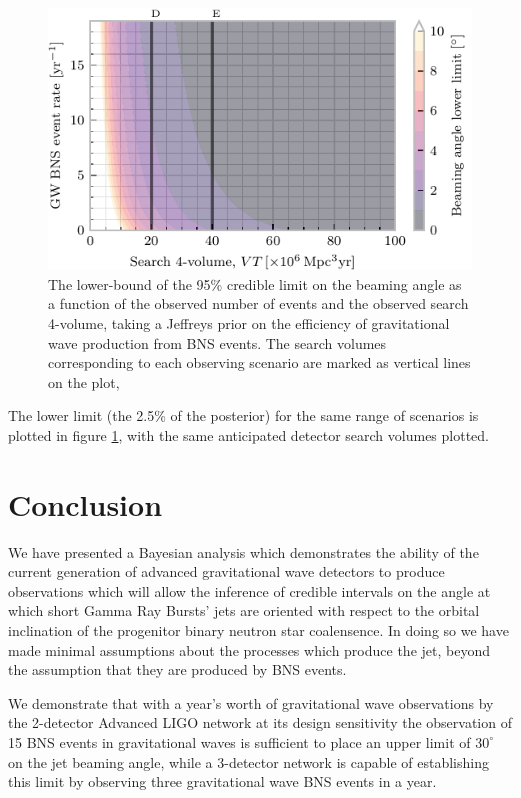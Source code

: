 \documentclass[twocolumn,nofootinbib]{revtex4-1}
\begin{document}
\begin{figure}
\centering
\includegraphics[width=\linewidth]{volume_v_nevents_lower.pdf}
\caption{\label{fig:volumevevents_lower} The lower-bound of the 95\%
  credible limit on the beaming angle as a function of the observed
  number of events and the observed search 4-volume, taking a Jeffreys
  prior on the efficiency of gravitational wave production from BNS
  events. The search volumes corresponding to each observing scenario
  are marked as vertical lines on the plot, }
\end{figure}

The lower limit (the 2.5\% of the posterior) for the same range of
scenarios is plotted in figure \ref{fig:volumevevents_lower}, with the
same anticipated detector search volumes plotted.

\section{Conclusion}

We have presented a Bayesian analysis which demonstrates the ability
of the current generation of advanced gravitational wave detectors to
produce observations which will allow the inference of credible
intervals on the angle at which short Gamma Ray Bursts' jets are
oriented with respect to the orbital inclination of the progenitor
binary neutron star coalensence. In doing so we have made minimal
assumptions about the processes which produce the jet, beyond the
assumption that they are produced by BNS events.

We demonstrate that with a year's worth of gravitational wave
observations by the 2-detector Advanced LIGO network at its design
sensitivity the observation of 15 BNS events in gravitational waves is
sufficient to place an upper limit of $30^{\circ}$ on the jet beaming
angle, while a 3-detector network is capable of establishing this
limit by observing three gravitational wave BNS events in a year.
\end{document}
